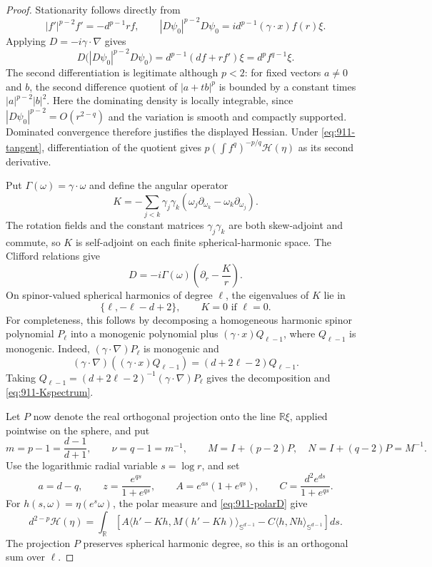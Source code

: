 \documentclass[11pt,a4paper]{article}
\theoremstyle{remark}
\begin{document}
\begin{proof}
Stationarity follows directly from
\[
 |f'|^{p-2}f'=-d^{p-1}rf,
 \qquad
 |D\psi_0|^{p-2}D\psi_0
       =i d^{p-1}(\gamma\cdot x)f(r)\xi.
\]
Applying $D=-i\gamma\cdot\nabla$ gives
\[
 D\bigl(|D\psi_0|^{p-2}D\psi_0\bigr)
 =d^{p-1}(df+rf')\xi=d^p f^{q-1}\xi.
\]
The second differentiation is legitimate although $p<2$:
for fixed vectors $a\ne0$ and $b$, the second difference quotient
of $|a+tb|^p$ is bounded by a constant times $|a|^{p-2}|b|^2$.
Here the dominating density is locally integrable, since
$|D\psi_0|^{p-2}=O(r^{2-q})$ and the variation is smooth and compactly supported.
Dominated convergence therefore justifies the displayed Hessian.
Under \eqref{eq:911-tangent}, differentiation of the quotient gives
$p(\int f^q)^{-p/q}\mathcal H(\eta)$ as its second derivative.

Put $\Gamma(\omega)=\gamma\cdot\omega$ and define the angular operator
\[
 K=-\sum_{j<k}\gamma_j\gamma_k
       (\omega_j\partial_{\omega_k}-\omega_k\partial_{\omega_j}).
\]
The rotation fields and the constant matrices $\gamma_j\gamma_k$ are
both skew-adjoint and commute, so $K$ is self-adjoint on each finite
spherical-harmonic space. The Clifford relations give
\begin{equation}\label{eq:911-polarD}
 D=-i\Gamma(\omega)\left(\partial_r-\frac Kr\right).
\end{equation}
On spinor-valued spherical harmonics of degree $\ell$, the eigenvalues of
$K$ lie in
\begin{equation}\label{eq:911-Kspectrum}
 \{\ell,-\ell-d+2\},\qquad K=0\text{ if }\ell=0.
\end{equation}
For completeness, this follows by decomposing a homogeneous harmonic
spinor polynomial $P_\ell$ into a monogenic polynomial plus
$(\gamma\cdot x)Q_{\ell-1}$, where $Q_{\ell-1}$ is monogenic. Indeed,
$(\gamma\cdot\nabla)P_\ell$ is monogenic and
\[
 (\gamma\cdot\nabla)((\gamma\cdot x)Q_{\ell-1})
       =(d+2\ell-2)Q_{\ell-1}.
\]
Taking $Q_{\ell-1}=(d+2\ell-2)^{-1}(\gamma\cdot\nabla)P_\ell$
gives the decomposition and \eqref{eq:911-Kspectrum}.

Let $P$ now denote the real orthogonal projection onto the line
$\mathbb R\xi$, applied pointwise on the sphere, and put
\[
 m=p-1=\frac{d-1}{d+1},\qquad
 \nu=q-1=m^{-1},\qquad M=I+(p-2)P,\quad N=I+(q-2)P=M^{-1}.
\]
Use the logarithmic radial variable $s=\log r$, and set
\[
 a=d-q,\qquad z=\frac{e^{qs}}{1+e^{qs}},\qquad
 A=e^{as}(1+e^{qs}),\qquad C=\frac{d^2e^{ds}}{1+e^{qs}}.
\]
For $h(s,\omega)=\eta(e^s\omega)$, the polar measure and
\eqref{eq:911-polarD} give
\begin{equation}\label{eq:911-cylinderH}
 d^{2-p}\mathcal H(\eta)
 =\int_{\mathbb R}\left[
 A\langle h'-Kh,M(h'-Kh)\rangle_{\mathbb S^{d-1}}
 -C\langle h,Nh\rangle_{\mathbb S^{d-1}}\right]ds.
\end{equation}
The projection $P$ preserves spherical harmonic degree, so this is an
orthogonal sum over $\ell$.


\end{proof}
\end{document}
